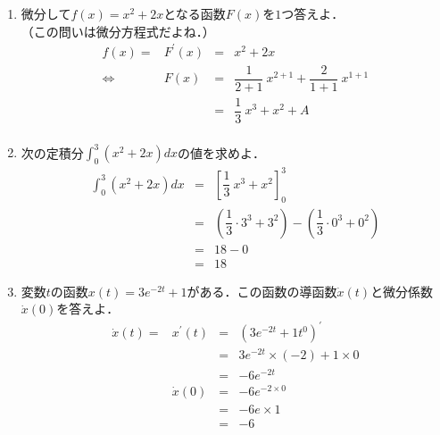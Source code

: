 \documentclass[a4paper,11pt]{ltjsarticle}
\newcommand{\dint}[2]{\displaystyle{\int_{#1}^{#2}}}
\begin{document}
\begin{enumerate}
\clearpage
  
  \item 微分して$f(x)=x^{2}+2x$となる函数$F(x)$を$1$つ答えよ．\\（この問いは微分方程式だよね．）
  \begin{equation}
    \renewcommand{\arraystretch}{2}
    \begin{array}{rccl}
      f(x)=
      &
      F^{\prime}(x)
      &=&
      x^{2}+2x
      \\
      \Leftrightarrow
      &
      F(x)
      &=&
      \dfrac{1}{2+1}\ x^{2+1}+\dfrac{2}{1+1}\ x^{1+1}
      \\
      &
      &=&
      \dfrac{1}{3}\ x^{3}+x^{2}+A
      \\
    \end{array}
  \end{equation}

  \item 次の定積分$\dint{0}{3}(x^{2}+2x)dx$の値を求めよ．\\
  \begin{equation}
    \renewcommand{\arraystretch}{2}
    \begin{array}{rcl}
      \dint{0}{3}(x^{2}+2x)dx
      &=&
      \left[\dfrac{1}{3}\ x^{3}+x^{2} \right]_0^3
      \\
      &=&
      \left(\dfrac{1}{3} \cdot 3^{3} + 3^{2}\right)-\left(\dfrac{1}{3} \cdot 0^{3} + 0^{2}\right)
      \\
      &=&
      18-0
      \\
      &=&
      18
    \end{array}
  \end{equation}
  \item 変数$t$の函数$x(t)=3e^{-2t}+1$がある．この函数の導函数$\dot{x}(t)$と微分係数$\dot{x}(0)$を答えよ．
  \begin{equation}
    \renewcommand{\arraystretch}{2}
    \begin{array}{rccl}
      \dot{x}(t)=
      &
      x^{\prime}(t)
      &=&
      (3e^{-2t}+1t^{0})^{\prime}
      \\
      &
      &=&
      3e^{-2t} \times (-2) +1 \times 0
      \\
      &
      &=&
      -6e^{-2t}
      \\
      &
      \dot{x}(0)
      &=&
      -6e^{-2 \times 0}
      \\
      &
      &=&
      -6e \times 1
      \\
      &
      &=&
      -6
    \end{array}
  \end{equation}
\end{enumerate}
\end{document}

